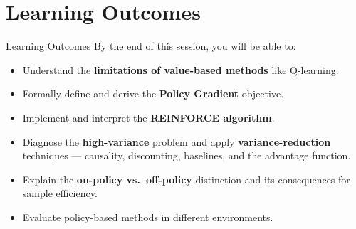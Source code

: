 \section{Learning Outcomes}
\begin{frame}{Learning Outcomes}
    \large
    By the end of this session, you will be able to:
    \vspace{0.3em}
    \begin{itemize}
        \setlength{\itemsep}{0.6em}
        \item Understand the \textbf{limitations of value-based methods} like Q-learning.
        \item Formally define and derive the \textbf{Policy Gradient} objective.
        \item Implement and interpret the \textbf{REINFORCE algorithm}.
        \item Diagnose the \textbf{high-variance} problem and apply \textbf{variance-reduction} techniques --- causality, discounting, baselines, and the advantage function.
        \item Explain the \textbf{on-policy vs.\ off-policy} distinction and its consequences for sample efficiency.
        \item Evaluate policy-based methods in different environments.
    \end{itemize}
\end{frame}